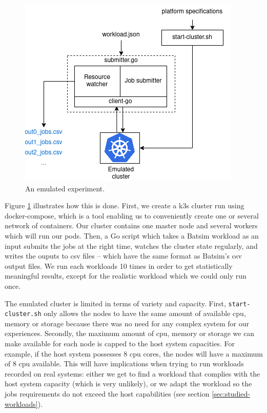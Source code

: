 \begin{figure}[H]
	\centering
	\includegraphics[scale=0.7]{./../imgs/prot-k3s.png}
	\caption{An emulated experiment.}
	\label{fig:emulated-expe}
\end{figure}

Figure \ref{fig:emulated-expe} illustrates how this is done. First, we create a
k3s cluster run using docker-compose, which is a tool enabling us to
conveniently create one or several network of containers. Our cluster contains
one master node and several workers which will run our pods. Then, a Go script
which takes a Batsim workload as an input submits the jobs at the right time,
watches the cluster state regularly, and writes the ouputs to csv files --
which have the same format as Batsim's csv output files. We run each workloads
10 times in order to get statistically meaningful results, except for the
realistic workload which we could only run once.

The emulated cluster is limited in terms of variety and capacity. First,
\texttt{start-cluster.sh} only allows the nodes to have the same amount of
available cpu, memory or storage because there was no need for any complex
system for our experiences. Secondly, the maximum amount of cpu, memory or
storage we can make available for each node is capped to the host system
capacities. For example, if the host system possesses 8 cpu cores, the nodes
will have a maximum of 8 cpu available. This will have implications when trying
to run workloads recorded on real systems: either we get to find a workload
that complies with the host system capacity (which is very unlikely), or we
adapt the workload so the jobs requirements do not exceed the host
capabilities (see section \ref{sec:studied-workloads}).

